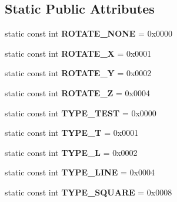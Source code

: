 \subsection*{Static Public Attributes}
\begin{DoxyCompactItemize}
\item 
\hypertarget{class_block_afe2bfaa9c9006d31f73234396c5f751b}{static const int {\bfseries R\-O\-T\-A\-T\-E\-\_\-\-N\-O\-N\-E} = 0x0000}\label{class_block_afe2bfaa9c9006d31f73234396c5f751b}

\item 
\hypertarget{class_block_aff8a81126a2c480017d0ca7c41658ab0}{static const int {\bfseries R\-O\-T\-A\-T\-E\-\_\-\-X} = 0x0001}\label{class_block_aff8a81126a2c480017d0ca7c41658ab0}

\item 
\hypertarget{class_block_a89c7d5c8e96b7826291c323eae84db1f}{static const int {\bfseries R\-O\-T\-A\-T\-E\-\_\-\-Y} = 0x0002}\label{class_block_a89c7d5c8e96b7826291c323eae84db1f}

\item 
\hypertarget{class_block_a3f6e3d496f3944aaf4fcba7311aa8147}{static const int {\bfseries R\-O\-T\-A\-T\-E\-\_\-\-Z} = 0x0004}\label{class_block_a3f6e3d496f3944aaf4fcba7311aa8147}

\item 
\hypertarget{class_block_a13803616354222a3366865a727fa5aff}{static const int {\bfseries T\-Y\-P\-E\-\_\-\-T\-E\-S\-T} = 0x0000}\label{class_block_a13803616354222a3366865a727fa5aff}

\item 
\hypertarget{class_block_aaad4eec71c1b52a039292d08b719331a}{static const int {\bfseries T\-Y\-P\-E\-\_\-\-T} = 0x0001}\label{class_block_aaad4eec71c1b52a039292d08b719331a}

\item 
\hypertarget{class_block_a0567e31a07ee22cdf0fc1711716342c8}{static const int {\bfseries T\-Y\-P\-E\-\_\-\-L} = 0x0002}\label{class_block_a0567e31a07ee22cdf0fc1711716342c8}

\item 
\hypertarget{class_block_a36af052151d2597d4c9dc59be346da22}{static const int {\bfseries T\-Y\-P\-E\-\_\-\-L\-I\-N\-E} = 0x0004}\label{class_block_a36af052151d2597d4c9dc59be346da22}

\item 
\hypertarget{class_block_aa135bf5b73c1e1eac761885182bd87d7}{static const int {\bfseries T\-Y\-P\-E\-\_\-\-S\-Q\-U\-A\-R\-E} = 0x0008}\label{class_block_aa135bf5b73c1e1eac761885182bd87d7}

\end{DoxyCompactItemize}

